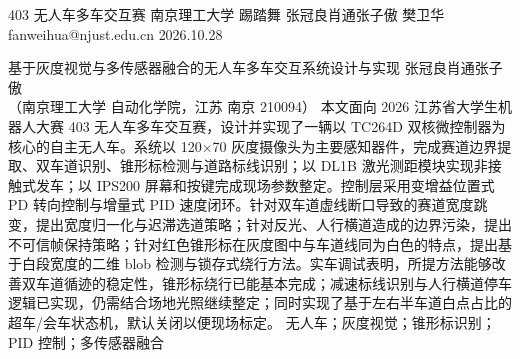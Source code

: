 \documentclass{MaiTechReport}
\begin{document}
\MaiCover
  {403 无人车多车交互赛}
  {南京理工大学}
  {踢踏舞}
  {张冠良\quad 肖通\quad 张子傲}
  {樊卫华 fanweihua@njust.edu.cn}
  {2026.10.28}

\MaiAuthorization

\MaiChineseAbstract
  {基于灰度视觉与多传感器融合的无人车多车交互系统设计与实现}
  {张冠良\quad 肖通\quad 张子傲\\
   （南京理工大学 自动化学院，江苏 南京 210094）}
  {本文面向 2026 江苏省大学生机器人大赛 403 无人车多车交互赛，设计并实现了一辆以 TC264D 双核微控制器为核心的自主无人车。系统以 120$\times$70 灰度摄像头为主要感知器件，完成赛道边界提取、双车道识别、锥形标检测与道路标线识别；以 DL1B 激光测距模块实现非接触式发车；以 IPS200 屏幕和按键完成现场参数整定。控制层采用变增益位置式 PD 转向控制与增量式 PID 速度闭环。针对双车道虚线断口导致的赛道宽度跳变，提出宽度归一化与迟滞选道策略；针对反光、人行横道造成的边界污染，提出不可信帧保持策略；针对红色锥形标在灰度图中与车道线同为白色的特点，提出基于白段宽度的二维 blob 检测与锁存式绕行方法。实车调试表明，所提方法能够改善双车道循迹的稳定性，锥形标绕行已能基本完成；减速标线识别与人行横道停车逻辑已实现，仍需结合场地光照继续整定；同时实现了基于左右半车道白点占比的超车/会车状态机，默认关闭以便现场标定。}
  {无人车；灰度视觉；锥形标识别；PID 控制；多传感器融合}
\end{document}
